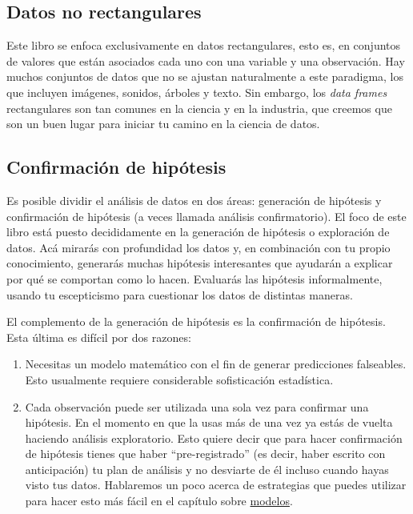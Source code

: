\documentclass[11pt,oneside]{report}
\begin{document}
\hypertarget{datos-no-rectangulares}{%
\subsection{Datos no rectangulares}\label{datos-no-rectangulares}}

Este libro se enfoca exclusivamente en datos rectangulares, esto es, en
conjuntos de valores que están asociados cada uno con una variable y una
observación. Hay muchos conjuntos de datos que no se ajustan
naturalmente a este paradigma, los que incluyen imágenes, sonidos,
árboles y texto. Sin embargo, los \emph{data frames} rectangulares son
tan comunes en la ciencia y en la industria, que creemos que son un buen
lugar para iniciar tu camino en la ciencia de datos.

\hypertarget{confirmaciuxf3n-de-hipuxf3tesis}{%
\subsection{Confirmación de
hipótesis}\label{confirmaciuxf3n-de-hipuxf3tesis}}

Es posible dividir el análisis de datos en dos áreas: generación de
hipótesis y confirmación de hipótesis (a veces llamada análisis
confirmatorio). El foco de este libro está puesto decididamente en la
generación de hipótesis o exploración de datos. Acá mirarás con
profundidad los datos y, en combinación con tu propio conocimiento,
generarás muchas hipótesis interesantes que ayudarán a explicar por qué
se comportan como lo hacen. Evaluarás las hipótesis informalmente,
usando tu escepticismo para cuestionar los datos de distintas maneras.

El complemento de la generación de hipótesis es la confirmación de
hipótesis. Esta última es difícil por dos razones:

\begin{enumerate}
\def\labelenumi{\arabic{enumi}.}
\item
  Necesitas un modelo matemático con el fin de generar predicciones
  falseables. Esto usualmente requiere considerable sofisticación
  estadística.
\item
  Cada observación puede ser utilizada una sola vez para confirmar una
  hipótesis. En el momento en que la usas más de una vez ya estás de
  vuelta haciendo análisis exploratorio. Esto quiere decir que para
  hacer confirmación de hipótesis tienes que haber ``pre-registrado''
  (es decir, haber escrito con anticipación) tu plan de análisis y no
  desviarte de él incluso cuando hayas visto tus datos. Hablaremos un
  poco acerca de estrategias que puedes utilizar para hacer esto más
  fácil en el capítulo sobre \protect\hyperlink{model-intro}{modelos}.
\end{enumerate}
\end{document}
